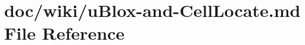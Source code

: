 \hypertarget{u_blox-and-_cell_locate_8md}{}\section{doc/wiki/u\+Blox-\/and-\/\+Cell\+Locate.md File Reference}
\label{u_blox-and-_cell_locate_8md}
